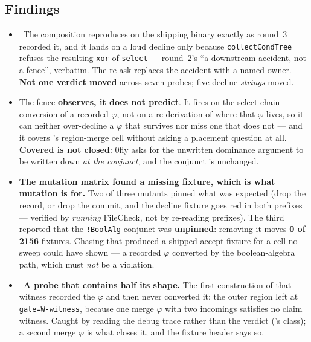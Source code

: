 \subsection*{Findings}
\begin{itemize}
  \item \fconfirmed\ The composition reproduces on the shipping binary exactly as round~3
        recorded it, and it lands on a loud decline only because \texttt{collectCondTree}
        refuses the resulting \texttt{xor}-of-\texttt{select} --- round~2's ``a downstream
        accident, not a fence'', verbatim. The re-ask replaces the accident with a named owner.
        \textbf{Not one verdict moved} across seven probes; five decline \emph{strings} moved.
  \item The fence \textbf{observes, it does not predict}. It fires on the select-chain
        conversion of a recorded \(\varphi\), not on a re-derivation of where that \(\varphi\)
        lives, so it can neither over-decline a \(\varphi\) that survives nor miss one that does
        not --- and it covers 's region-merge cell without asking a
        placement question at all. \textbf{Covered is not closed}: 0fly asks for the unwritten
        dominance argument to be written down \emph{at the conjunct}, and the conjunct is
        unchanged.
  \item \textbf{The mutation matrix found a missing fixture, which is what mutation is for.}
        Two of three mutants pinned what was expected (drop the record, or drop the commit, and
        the decline fixture goes red in both prefixes --- verified by \emph{running} FileCheck,
        not by re-reading prefixes). The third reported that the \texttt{!BoolAlg} conjunct was
        \textbf{unpinned}: removing it moves \textbf{0 of 2156} fixtures. Chasing that produced
        a shipped accept fixture for a cell no sweep could have shown --- a recorded \(\varphi\)
        converted by the boolean-algebra path, which must \emph{not} be a violation.
  \item \fconfirmed\ \textbf{A probe that contains half its shape.} The first construction of
        that witness recorded the \(\varphi\) and then never converted it: the outer region left
        at \texttt{gate=W-witness}, because one merge \(\varphi\) with two incomings satisfies no
        claim witness. Caught by reading the debug trace rather than the verdict
        ('s class); a second merge \(\varphi\) is what closes it,
        and the fixture header says so.

\end{itemize}
